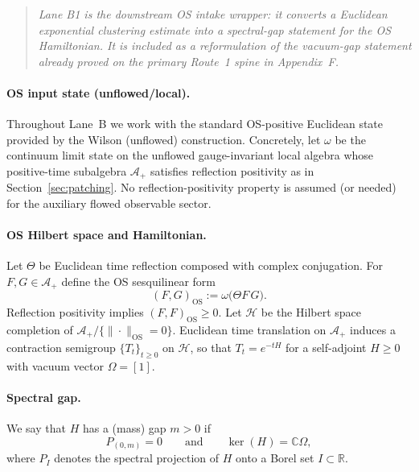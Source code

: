 \begin{quote}
\emph{Lane B1 is the downstream OS intake wrapper: it converts a Euclidean exponential clustering estimate into a spectral-gap statement for the OS Hamiltonian. It is included as a reformulation of the vacuum-gap statement already proved on the primary Route~1 spine in Appendix~F.}
\end{quote}

\paragraph{OS input state (unflowed/local).}
Throughout Lane~B we work with the standard OS-positive Euclidean state provided by the Wilson (unflowed) construction.
Concretely, let $\omega$ be the continuum limit state on the unflowed gauge-invariant local algebra whose
positive-time subalgebra $\mathcal A_+$ satisfies reflection positivity as in Section~\ref{sec:patching}.
No reflection-positivity property is assumed (or needed) for the auxiliary flowed observable sector.

\paragraph{OS Hilbert space and Hamiltonian.}
Let $\Theta$ be Euclidean time reflection composed with complex conjugation.
For $F,G\in\mathcal A_+$ define the OS sesquilinear form
\[
(F,G)_{\mathrm{OS}}:=\omega\big(\Theta F\,G\big).
\]
Reflection positivity implies $(F,F)_{\mathrm{OS}}\ge 0$.
Let $\mathcal H$ be the Hilbert space completion of $\mathcal A_+ / \{\|\cdot\|_{\mathrm{OS}}=0\}$.
Euclidean time translation on $\mathcal A_+$ induces a contraction semigroup $\{T_t\}_{t\ge 0}$ on $\mathcal H$,
so that $T_t=e^{-tH}$ for a self-adjoint $H\ge 0$ with vacuum vector $\Omega=[1]$.

\paragraph{Spectral gap.}
We say that $H$ has a (mass) gap $m>0$ if
\[
P_{(0,m)}=0
\qquad\text{and}\qquad
\ker(H)=\mathbb C\Omega,
\]
where $P_I$ denotes the spectral projection of $H$ onto a Borel set $I\subset\mathbb R$.

